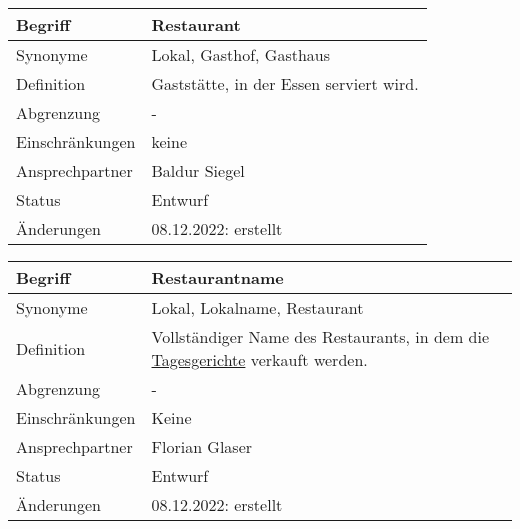 \begin{table}[H]
    \centering
    \label{gls:restaurant}
    \begin{tabularx}{\textwidth}{| l | X |}
        \hline
        Begriff         & Restaurant                              \\
        \hline
        Synonyme        & Lokal, Gasthof, Gasthaus                \\
        \hline
        Definition      & Gaststätte, in der Essen serviert wird. \\
        \hline
        Abgrenzung      & -                                       \\
        \hline
        Einschränkungen & keine                                   \\
        \hline
        Ansprechpartner & Baldur Siegel                           \\
        \hline
        Status          & Entwurf                                 \\
        \hline
        Änderungen      & 08.12.2022: erstellt                    \\
        \hline
    \end{tabularx}
\end{table}

\begin{table}[H]
    \centering
    \label{gls:restaurantname}
    \begin{tabularx}{\textwidth}{| l | X |}
        \hline
        Begriff         & Restaurantname                                                                                             \\
        \hline
        Synonyme        & Lokal, Lokalname, Restaurant                                                                               \\
        \hline
        Definition      & Vollständiger Name des Restaurants, in dem die \hyperref[gls:tagesgericht]{Tagesgerichte} verkauft werden. \\
        \hline
        Abgrenzung      & -                                                                                                          \\
        \hline
        Einschränkungen & Keine                                                                                                      \\
        \hline
        Ansprechpartner & Florian Glaser                                                                                             \\
        \hline
        Status          & Entwurf                                                                                                    \\
        \hline
        Änderungen      & 08.12.2022: erstellt                                                                                       \\
        \hline
    \end{tabularx}
\end{table}

